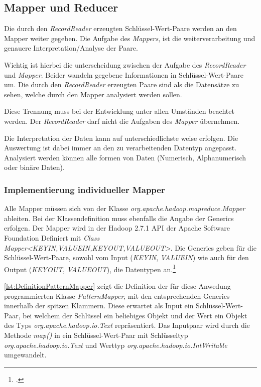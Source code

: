 \subsection{Mapper und Reducer}
Die durch den \textit{RecordReader} erzeugten Schlüssel-Wert-Paare werden an den Mapper weiter gegeben. Die Aufgabe des \textit{Mappers}, ist die weiterverarbeitung und genauere Interpretation/Analyse der Paare.

Wichtig ist hierbei die unterscheidung zwischen der Aufgabe des \textit{RecordReader} und \textit{Mapper}. Beider wandeln gegebene Informationen in Schlüssel-Wert-Paare um. Die durch den \textit{RecordReader} erzeugten Paare sind als die Datensätze zu sehen, welche durch den Mapper analysiert werden sollen.

Diese Trennung muss bei der Entwicklung unter allen Umständen beachtet werden. Der \textit{RecordReader} darf nicht die Aufgaben des \textit{Mapper} übernehmen.

Die Interpretation der Daten kann auf unterschiedlichste weise erfolgen. Die Auswertung ist dabei immer an den zu verarbeitenden Datentyp angepasst. Analysiert werden können alle formen von Daten (Numerisch, Alphanumerisch oder binäre Daten).

\subsubsection{Implementierung individueller Mapper}
Alle Mapper müssen sich von der Klasse \textit{org.apache.hadoop.mapreduce.Mapper} ableiten. Bei der Klassendefinition muss ebenfalls die Angabe der \glspl{Generic} erfolgen. Der Mapper wird in der Hadoop 2.7.1 \ac{API} der Apache Software Foundation Definiert mit \textit{Class Mapper<KEYIN,VALUEIN,KEYOUT,VALUEOUT>}. Die \glspl{Generic} geben für die Schlüssel-Wert-Paare, sowohl vom Input (\textit{KEYIN}, \textit{VALUEIN}) wie auch für den Output (\textit{KEYOUT}, \textit{VALUEOUT}), die Datentypen an.\footcite[Vgl.][]{ApacheHadoopApiDokuMapper.2015}

\autoref{lst:DefinitionPatternMapper} zeigt die Definition der für diese Anwedung programmierten Klasse \textit{PatternMapper}, mit den entsprechenden Generics innerhalb der spitzen Klammern. Diese erwartet als Input ein Schlüssel-Wert-Paar, bei welchem der Schlüssel ein beliebiges Objekt und der Wert ein Objekt des Typs \textit{org.apache.hadoop.io.Text} repräsentiert. Das Inputpaar wird durch die Methode \textit{map()} in ein Schlüssel-Wert-Paar mit Schlüsseltyp \textit{org.apache.hadoop.io.Text} und Werttyp \textit{org.apache.hadoop.io.IntWritable} umgewandelt. \\

